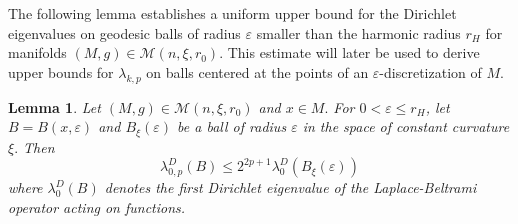 \documentclass[10 pt, reqno]{amsart}
\newtheorem{lemma}[theorem]{Lemma}
\begin{document}
The following lemma establishes a uniform upper bound for the Dirichlet eigenvalues on geodesic balls of radius $\varepsilon$ smaller than the harmonic radius $r_H$ for manifolds  $(M,g) \in \mathcal{M}(n,\xi,r_0)$. 
This estimate will later be used to derive upper bounds for $\lambda_{k,p}$ on balls centered at the points of an $\varepsilon$-discretization of $M$.
\begin{lemma}    \label{lem:upper bound dirichlet eigenvalue}
Let $(M,g)\in \mathcal{M}(n,\xi,r_0)$ and $x\in M.$ For $0<\varepsilon\le r_H$,  let $B=B(x, \varepsilon)$ and $B_\xi(\varepsilon)$ be a ball of radius $\varepsilon$ in the space of constant curvature $\xi.$ Then   
\[\lambda_{0,p}^D(B)\le 2^{2p+1}\lambda_0^D(B_\xi(\varepsilon))\]
where $\lambda_0^D(B)$ denotes the first Dirichlet eigenvalue of the Laplace-Beltrami operator acting on functions.
\end{lemma}
\end{document}
